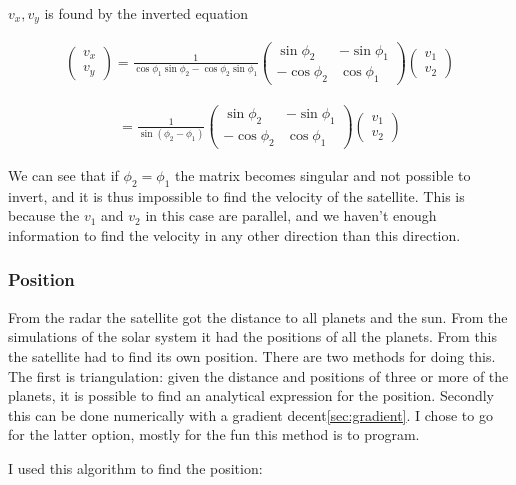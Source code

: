 \documentclass[a4paper, 10pt]{article}
\begin{document}
$v_x,v_y$ is found by the inverted equation

\begin{align}
\begin{pmatrix}
v_x\\
v_y
\end{pmatrix}
=
\frac{1}{\cos \phi_1 \sin \phi_2 - \cos \phi_2 \sin \phi_1}
\begin{pmatrix}
\sin \phi_2 & -\sin \phi_1 \\
-\cos \phi_2 & \cos \phi_1 
\end{pmatrix}
\begin{pmatrix}
v_1\\
v_2
\end{pmatrix}
\end{align}

\begin{align}
=
\frac{1}{\sin (\phi_2 - \phi_1)}
\begin{pmatrix}
\sin \phi_2 & -\sin \phi_1 \\
-\cos \phi_2 & \cos \phi_1 
\end{pmatrix}
\begin{pmatrix}
v_1\\
v_2
\end{pmatrix}
\end{align}

We can see that if $\phi_2 = \phi_1$ the matrix becomes singular and not possible to invert, and it is thus impossible to find the velocity of the satellite. This is because the $v_1$ and $v_2$ in this case are parallel, and we haven't enough information to find the velocity in any other direction than this direction.


\subsubsection{Position}
From the radar the satellite got the distance to all planets and the sun. From the simulations of the solar system it had the positions of all the planets. From this the satellite had to find its own position. There are two methods for doing this. The first is triangulation: given the distance and positions of three or more of the planets, it is possible to find an analytical expression for the position. Secondly this can be done numerically with a gradient decent\ref{sec:gradient}. I chose to go for the latter option, mostly for the fun this method is to program.

I used this algorithm to find the position:
\end{document}
